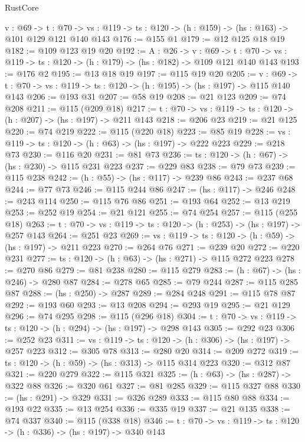 \begin{lexlean}{RustCore}
\begin{coremodule}
  {v : @69} ->
  {t : @70} -> {vs : @119} -> {ts : @120} -> (h : @159) -> (hs : @163) -> @101 @129 @121 @140 @143
@176 := @155 @1
@179 := @12 @125 @18 @19
@182 := @109 @123 @19 @20
@192 := {A : @26} ->
  {v : @69} ->
  {t : @70} -> {vs : @119} -> {ts : @120} -> (h : @179) -> (hs : @182) -> @109 @121 @140 @143
@193 := @176 @2
@195 := @13 @18 @19
@197 := @115 @19 @20
@205 := {v : @69} ->
  {t : @70} -> {vs : @119} -> {ts : @120} -> (h : @195) -> (hs : @197) -> @115 @140 @143
@206 := @193 @31
@207 := @58 @19
@208 := @21 @123
@209 := @74 @208
@211 := @115 (@209 @18)
@217 := {t : @70} -> {vs : @119} -> {ts : @120} -> (h : @207) -> (hs : @197) -> @211 @143
@218 := @206 @23
@219 := @21 @125
@220 := @74 @219
@222 := @115 (@220 @18)
@223 := @85 @19
@228 := {vs : @119} -> {ts : @120} -> (h : @63) -> (hs : @197) -> @222 @223
@229 := @218 @73
@230 := @116 @20
@231 := @81 @73
@236 := {ts : @120} -> (h : @67) -> (hs : @230) -> @115 @231 @223
@237 := @229 @83
@238 := @79 @73
@239 := @115 @238
@242 := (h : @55) -> (hs : @117) -> @239 @86
@243 := @237 @68
@244 := @77 @73
@246 := @115 @244 @86
@247 := (hs : @117) -> @246
@248 := @243 @114
@250 := @115 @76 @86
@251 := @193 @64
@252 := @13 @219
@253 := @252 @19
@254 := @21 @121
@255 := @74 @254
@257 := @115 (@255 @18)
@263 := {t : @70} -> {vs : @119} -> {ts : @120} -> (h : @253) -> (hs : @197) -> @257 @143
@264 := @251 @23
@269 := {vs : @119} -> {ts : @120} -> (h : @59) -> (hs : @197) -> @211 @223
@270 := @264 @76
@271 := @239 @20
@272 := @220 @231
@277 := {ts : @120} -> (h : @63) -> (hs : @271) -> @115 @272 @223
@278 := @270 @86
@279 := @81 @238
@280 := @115 @279
@283 := (h : @67) -> (hs : @246) -> @280 @87
@284 := @278 @65
@285 := @79 @244
@287 := @115 @285 @87
@288 := (hs : @250) -> @287
@289 := @284 @248
@291 := @115 @78 @87
@292 := @193 @60
@293 := @13 @208
@294 := @293 @19
@295 := @21 @129
@296 := @74 @295
@298 := @115 (@296 @18)
@304 := {t : @70} -> {vs : @119} -> {ts : @120} -> (h : @294) -> (hs : @197) -> @298 @143
@305 := @292 @23
@306 := @252 @23
@311 := {vs : @119} -> {ts : @120} -> (h : @306) -> (hs : @197) -> @257 @223
@312 := @305 @78
@313 := @280 @20
@314 := @209 @272
@319 := {ts : @120} -> (h : @59) -> (hs : @313) -> @115 @314 @223
@320 := @312 @87
@321 := @220 @279
@322 := @115 @321
@325 := (h : @63) -> (hs : @287) -> @322 @88
@326 := @320 @61
@327 := @81 @285
@329 := @115 @327 @88
@330 := (hs : @291) -> @329
@331 := @326 @289
@333 := @115 @80 @88
@334 := @193 @22
@335 := @13 @254
@336 := @335 @19
@337 := @21 @135
@338 := @74 @337
@340 := @115 (@338 @18)
@346 := {t : @70} -> {vs : @119} -> {ts : @120} -> (h : @336) -> (hs : @197) -> @340 @143

\end{coremodule}
\end{lexlean}
